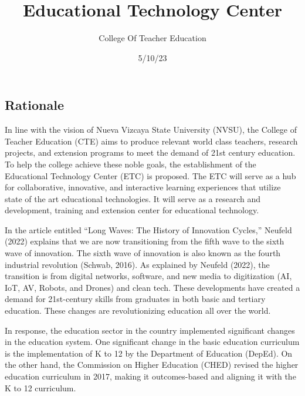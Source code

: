 \documentclass[
  12pt,
  foliopaper,
  DIV=11,
  numbers=noendperiod]{scrartcl}
\title{Educational Technology Center}
\author{College Of Teacher Education}
\date{5/10/23}
\begin{document}
\maketitle
\ifdefined\Shaded\renewenvironment{Shaded}{\begin{tcolorbox}[boxrule=0pt, frame hidden, borderline west={3pt}{0pt}{shadecolor}, interior hidden, sharp corners, enhanced, breakable]}{\end{tcolorbox}}\fi

\hypertarget{rationale}{%
\subsection{Rationale}\label{rationale}}

In line with the vision of Nueva Vizcaya State University (NVSU), the
College of Teacher Education (CTE) aims to produce relevant world class
teachers, research projects, and extension programs to meet the demand
of 21st century education. To help the college achieve these noble
goals, the establishment of the Educational Technology Center (ETC) is
proposed. The ETC will serve as a hub for collaborative, innovative, and
interactive learning experiences that utilize state of the art
educational technologies. It will serve as a research and development,
training and extension center for educational technology.

In the article entitled ``Long Waves: The History of Innovation
Cycles,'' Neufeld (2022) explains that we are now transitioning from the
fifth wave to the sixth wave of innovation. The sixth wave of innovation
is also known as the fourth industrial revolution (Schwab, 2016). As
explained by Neufeld (2022), the transition is from digital networks,
software, and new media to digitization (AI, IoT, AV, Robots, and
Drones) and clean tech. These developments have created a demand for
21st-century skills from graduates in both basic and tertiary education.
These changes are revolutionizing education all over the world.

In response, the education sector in the country implemented significant
changes in the education system. One significant change in the basic
education curriculum is the implementation of K to 12 by the Department
of Education (DepEd). On the other hand, the Commission on Higher
Education (CHED) revised the higher education curriculum in 2017, making
it outcomes-based and aligning it with the K to 12 curriculum.
\end{document}

